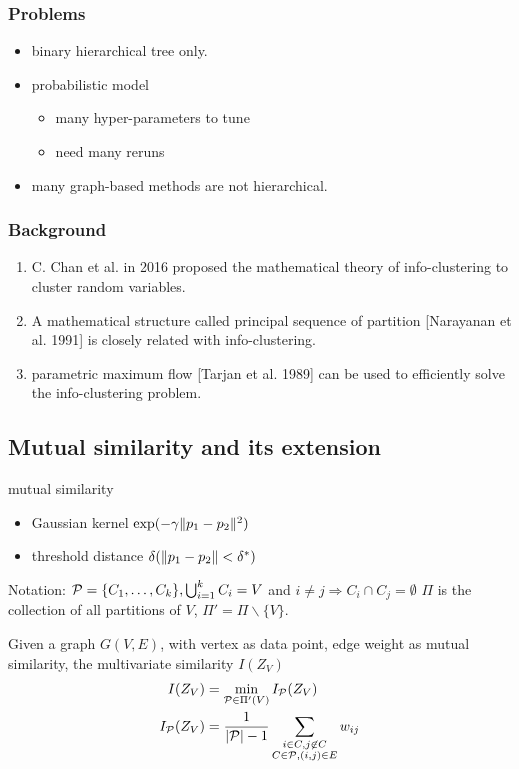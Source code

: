 \documentclass[notheorems]{beamer}
\begin{document}
\begin{frame}
\frametitle{Problems}
\begin{itemize}
\item binary hierarchical tree only.
\item probabilistic model
\begin{itemize}
\item many hyper-parameters to tune 
\item need many reruns
\end{itemize}
\item many graph-based methods are not hierarchical.
\end{itemize}
\end{frame}
\begin{frame}
	\frametitle{Background}
	\begin{enumerate}
		\item C. Chan et al. in 2016 proposed the mathematical theory of info-clustering to cluster random variables.
		\item A mathematical structure called principal sequence of partition [Narayanan et al. 1991] is closely related with info-clustering.
		\item parametric maximum flow [Tarjan et al. 1989] can be used to efficiently solve the info-clustering problem.
	\end{enumerate}
\end{frame}
\subsection{Mutual similarity and its extension}
\begin{frame}
\begin{block}{mutual similarity}
\begin{itemize}
\item Gaussian kernel $ \exp({-\gamma \norm{p_1 - p_2}^2})$
\item threshold distance $\delta(\norm{p_1-p_2} < \delta^*)$
\end{itemize}
\end{block}
Notation:  $\P=\{C_1, \dots, C_k\}, \bigcup_{i=1}^k C_i = V$ and $i\neq j \Rightarrow C_i \cap C_j = \emptyset$
$\Pi$ is the collection of all partitions of $V$, $\Pi' = \Pi \backslash \{V\}$.
\begin{definition}
Given a graph $G(V, E)$, with vertex as data point, edge weight as mutual similarity, the multivariate similarity $I(Z_V)$
\begin{align}
I(Z_V) & = \min_{\mathcal{P} \in \Pi'(V)} I_{\mathcal{P}}(Z_V) \\
\label{eq:newDef}  I_{\mathcal{P}}(Z_V) & = \frac{1}{ \abs{\mathcal{P}} - 1} \sum_{\substack{i\in C, j \not\in C\\ C\in \mathcal{P}, (i,j) \in E}} w_{ij}
\end{align}
\end{definition}
\end{frame}
\end{document}

